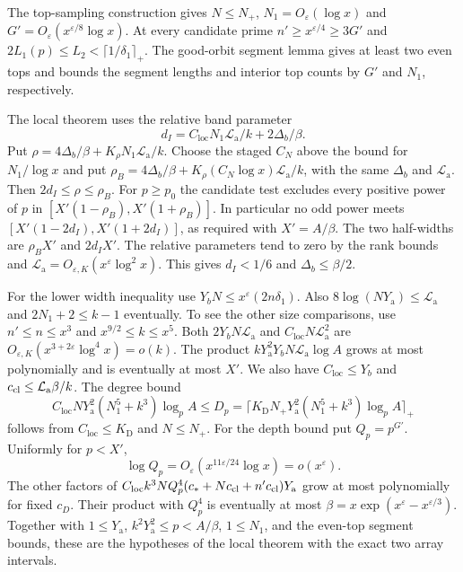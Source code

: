 The top-sampling construction gives \(N\le N_+\),
\(N_1=O_\varepsilon(\log x)\) and
\(G'=O_\varepsilon(x^{\varepsilon/8}\log x)\).
At every candidate prime \(n'\ge x^{\varepsilon/4}\ge3G'\) and
\(2L_1(p)\le L_2<\lceil1/\delta_1\rceil_+\).
The good-orbit segment lemma gives at least two even tops and
bounds the segment lengths and interior top counts by \(G'\)
and \(N_1\), respectively.

The local theorem uses the relative band parameter
\[
 d_I=C_{\mathrm{loc}}N_1\mathcal L_{\mathrm a}/k+2\Delta_b/\beta .
\]
Put \(\rho=4\Delta_b/\beta+K_\rho N_1\mathcal L_{\mathrm a}/k\).
Choose the staged \(C_N\) above the bound for \(N_1/\log x\) and
put \(\rho_B=4\Delta_b/\beta+
K_\rho(C_N\log x)\mathcal L_{\mathrm a}/k\),
with the same \(\Delta_b\) and \(\mathcal L_{\mathrm a}\).
Then \(2d_I\le\rho\le\rho_B\). For \(p\ge p_0\) the candidate test
excludes every positive power of \(p\) in
\([X'(1-\rho_B),X'(1+\rho_B)]\). In particular no odd power meets
\([X'(1-2d_I),X'(1+2d_I)]\), as required with \(X'=A/\beta\).
The two half-widths are \(\rho_B X'\) and \(2d_I X'\). The relative
parameters tend to zero by the rank bounds and
\(\mathcal L_{\mathrm a}=O_{\varepsilon,K}(x^\varepsilon\log^2 x)\).
This gives \(d_I<1/6\) and \(\Delta_b\le\beta/2\).

For the lower width inequality use
\(Y_bN\le x^\varepsilon(2n\delta_1)\). Also
\(8\log(NY_{\mathrm a})\le\mathcal L_{\mathrm a}\) and \(2N_1+2\le k-1\)
eventually. To see the other size comparisons, use
\(n'\le n\le x^3\) and \(x^{9/2}\le k\le x^5\).
Both \(2Y_bN\mathcal L_{\mathrm a}\) and
\(C_{\mathrm{loc}}N\mathcal L_{\mathrm a}^2\) are
\(O_{\varepsilon,K}(x^{3+2\varepsilon}\log^4 x)=o(k)\).
The product \(kY_{\mathrm a}^2Y_bN\mathcal L_{\mathrm a}\log A\) grows
at most polynomially and is eventually at most \(X'\).
We also have \(C_{\mathrm{loc}}\le Y_b\) and
\(c_{\rm cl}\le\mathcal L_{\mathrm a}\beta/k\).
The degree bound
\[
 C_{\mathrm{loc}}N Y_{\mathrm a}^2(N_1^5+k^3)\log_p A\le
 D_p=\big\lceil K_{\mathrm D}N_+Y_{\mathrm a}^2(N_1^5+k^3)\log_p A\big\rceil_+
\]
follows from \(C_{\mathrm{loc}}\le K_{\mathrm D}\) and \(N\le N_+\).
For the depth bound put \(Q_p=p^{G'}\). Uniformly for \(p<X'\),
\[
 \log Q_p=O_\varepsilon(x^{11\varepsilon/24}\log x)=o(x^\varepsilon).
\]
The other factors of
\(C_{\mathrm{loc}}k^3NQ_p^4(c_*+Nc_{\rm cl}+n'c_{\rm cl})Y_{\mathrm a}\)
grow at most polynomially for fixed \(c_D\). Their product with
\(Q_p^4\) is eventually at most
\(\beta=x\exp(x^\varepsilon-x^{\varepsilon/3})\).
Together with \(1\le Y_{\mathrm a}\), \(k^2Y_{\mathrm a}^2\le p<A/\beta\),
\(1\le N_1\), and the even-top segment bounds, these are the
hypotheses of the local theorem with the exact two array intervals.

